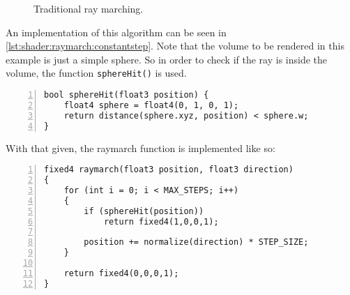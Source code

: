 \begin{figure}[H]
    \centering
    \caption{Traditional ray marching.}
\end{figure}

\noindent
An implementation of this algorithm can be seen in \autoref{lst:shader:raymarch:constantstep}. Note that the volume to be rendered in this example is just a simple sphere.
So in order to check if the ray is inside the volume, the function \lstinline[language=HLSL]{sphereHit()} is used.
\begin{lstlisting}[language=HLSL, numbers=left, caption=Implementation of a volume distance function for a sphere.,captionpos=b, label=lst:shader:raymarch:spherehit]
bool sphereHit(float3 position) {
    float4 sphere = float4(0, 1, 0, 1);
    return distance(sphere.xyz, position) < sphere.w;
}
\end{lstlisting}

\noindent
With that given, the raymarch function is implemented like so:

\begin{lstlisting}[language=HLSL, numbers=left, caption=Implementation of a ray march function with constant step.,captionpos=b, label=lst:shader:raymarch:constantstep]
fixed4 raymarch(float3 position, float3 direction)
{
    for (int i = 0; i < MAX_STEPS; i++)
    {
        if (sphereHit(position))
            return fixed4(1,0,0,1);
        
        position += normalize(direction) * STEP_SIZE;
    }
    
    return fixed4(0,0,0,1);
}
\end{lstlisting}


